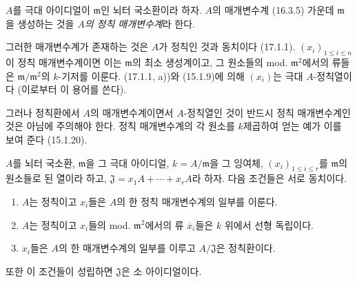 \begin{definition}[17.1.6]
\label{0.17.1.6-fr}
$A$를 극대 아이디얼이 $\mathfrak{m}$인 뇌터 국소환이라 하자.
$A$의 매개변수계 (16.3.5) 가운데 $\mathfrak{m}$을 생성하는 것을
\emph{$A$의 정칙 매개변수계}라 한다.
\end{definition}

그러한 매개변수계가 존재하는 것은 $A$가 정칙인 것과 동치이다
(17.1.1). $(x_i)_{1\leq i\leq n}$이 정칙 매개변수계이면 이는
$\mathfrak{m}$의 최소 생성계이고, 그 원소들의 mod.
$\mathfrak{m}^2$에서의 류들은 $\mathfrak{m}/\mathfrak{m}^2$의
$k$-기저를 이룬다. (17.1.1, a))와 (15.1.9)에 의해 $(x_i)$는 극대
$A$-정칙열이다 (이로부터 이 용어를 쓴다).

그러나 정칙환에서 $A$의 매개변수계이면서 $A$-정칙열인 것이 반드시
정칙 매개변수계인 것은 아님에 주의해야 한다. 정칙 매개변수계의 각
원소를 $k$제곱하여 얻는 예가 이를 보여 준다 (15.1.20).

\begin{proposition}[17.1.7]
\label{0.17.1.7-fr}
$A$를 뇌터 국소환, $\mathfrak{m}$을 그 극대 아이디얼,
$k=A/\mathfrak{m}$을 그 잉여체, $(x_i)_{1\leq i\leq r}$를
$\mathfrak{m}$의 원소들로 된 열이라 하고,
$\mathfrak{J}=x_1A+\cdots+x_rA$라 하자. 다음 조건들은 서로 동치이다.
\begin{enumerate}
  \item[\rm a)] $A$는 정칙이고 $x_i$들은 $A$의 한 정칙
  매개변수계의 일부를 이룬다.
  \item[\rm a')] $A$는 정칙이고 $x_i$들의 mod.
  $\mathfrak{m}^2$에서의 류 $\overline{x}_i$들은 $k$ 위에서 선형
  독립이다.
  \item[\rm b)] $x_i$들은 $A$의 한 매개변수계의 일부를 이루고
  $A/\mathfrak{J}$은 정칙환이다.
\end{enumerate}
또한 이 조건들이 성립하면 $\mathfrak{J}$은 소 아이디얼이다.
\end{proposition}

